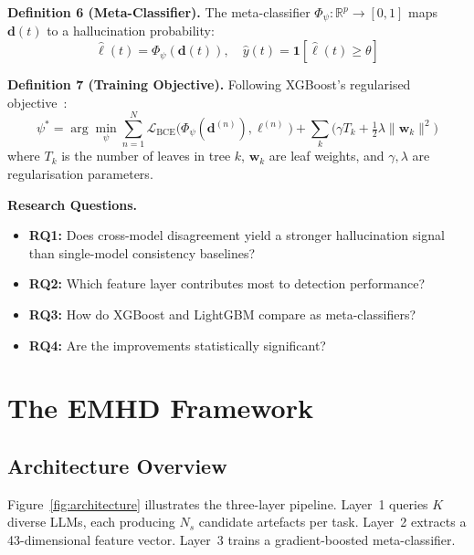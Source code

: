 \documentclass[runningheads]{llncs}
\begin{document}
\noindent\textbf{Definition 6 (Meta-Classifier).} The meta-classifier $\Phi_\psi: \mathbb{R}^p \to [0,1]$ maps $\mathbf{d}(t)$ to a hallucination probability:
\begin{equation}
\hat{\ell}(t) = \Phi_\psi(\mathbf{d}(t)), \quad \hat{y}(t) = \mathbf{1}[\hat{\ell}(t) \geq \theta]
\end{equation}

\noindent\textbf{Definition 7 (Training Objective).} Following XGBoost's regularised objective~\cite{chen2016xgboost}:
\begin{equation}
\psi^* = \arg\min_\psi \sum_{n=1}^{N} \mathcal{L}_{\mathrm{BCE}}\!\bigl(\Phi_\psi(\mathbf{d}^{(n)}), \ell^{(n)}\bigr) + \sum_{k} \bigl(\gamma T_k + \tfrac{1}{2}\lambda\|\mathbf{w}_k\|^2\bigr)
\label{eq:objective}
\end{equation}
where $T_k$ is the number of leaves in tree $k$, $\mathbf{w}_k$ are leaf weights, and $\gamma, \lambda$ are regularisation parameters.

\noindent\textbf{Research Questions.}
\begin{itemize}
\item \textbf{RQ1:} Does cross-model disagreement yield a stronger hallucination signal than single-model consistency baselines?
\item \textbf{RQ2:} Which feature layer contributes most to detection performance?
\item \textbf{RQ3:} How do XGBoost and LightGBM compare as meta-classifiers?
\item \textbf{RQ4:} Are the improvements statistically significant?
\end{itemize}


\section{The EMHD Framework}
\label{sec:method}

\subsection{Architecture Overview}

Figure~\ref{fig:architecture} illustrates the three-layer pipeline. Layer~1 queries $K$ diverse LLMs, each producing $N_s$ candidate artefacts per task. Layer~2 extracts a 43-dimensional feature vector. Layer~3 trains a gradient-boosted meta-classifier.
\end{document}

